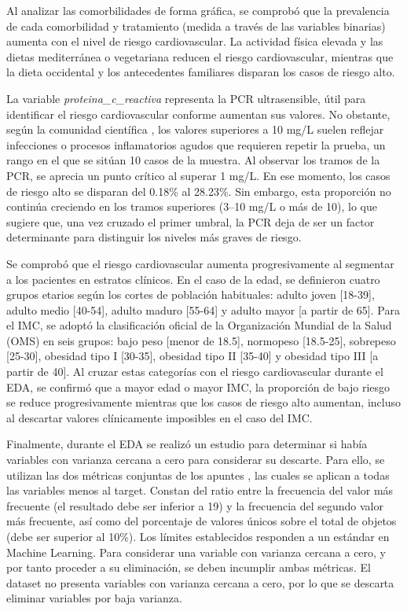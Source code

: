 \documentclass[journal,onecolumn]{IEEEtran}
\begin{document}
Al analizar las comorbilidades de forma gráfica, se comprobó que la prevalencia de cada comorbilidad y tratamiento (medida a través de las variables binarias) aumenta con el nivel de riesgo cardiovascular. La actividad física elevada y las dietas mediterránea o vegetariana reducen el riesgo cardiovascular, mientras que la dieta occidental y los antecedentes familiares disparan los casos de riesgo alto.

La variable \textit{proteina\_c\_reactiva} representa la PCR ultrasensible, útil para identificar el riesgo cardiovascular conforme aumentan sus valores. No obstante, según la comunidad científica \cite{pearson2003crp}, los valores superiores a 10 mg/L suelen reflejar infecciones o procesos inflamatorios agudos que requieren repetir la prueba, un rango en el que se sitúan 10 casos de la muestra. Al observar los tramos de la PCR, se aprecia un punto crítico al superar 1 mg/L. En ese momento, los casos de riesgo alto se disparan del 0.18\% al 28.23\%. Sin embargo, esta proporción no continúa creciendo en los tramos superiores (3–10 mg/L o más de 10), lo que sugiere que, una vez cruzado el primer umbral, la PCR deja de ser un factor determinante para distinguir los niveles más graves de riesgo.

Se comprobó que el riesgo cardiovascular aumenta progresivamente al segmentar a los pacientes en estratos clínicos. En el caso de la edad, se definieron cuatro grupos etarios según los cortes de población habituales: adulto joven [18-39], adulto medio [40-54], adulto maduro [55-64] y adulto mayor [a partir de 65]. Para el IMC, se adoptó la clasificación oficial de la Organización Mundial de la Salud (OMS) \cite{who2000obesity} en seis grupos: bajo peso [menor de 18.5], normopeso [18.5-25], sobrepeso [25-30], obesidad tipo I [30-35], obesidad tipo II [35-40] y obesidad tipo III [a partir de 40]. Al cruzar estas categorías con el riesgo cardiovascular durante el EDA, se confirmó que a mayor edad o mayor IMC, la proporción de bajo riesgo se reduce progresivamente mientras que los casos de riesgo alto aumentan, incluso al descartar valores clínicamente imposibles en el caso del IMC.

Finalmente, durante el EDA se realizó un estudio para determinar si había variables con varianza cercana a cero para considerar su descarte. Para ello, se utilizan las dos métricas conjuntas de los apuntes \cite{kuhn2013applied}, las cuales se aplican a todas las variables menos al target. Constan del ratio entre la frecuencia del valor más frecuente (el resultado debe ser inferior a 19) y la frecuencia del segundo valor más frecuente, así como del porcentaje de valores únicos sobre el total de objetos (debe ser superior al 10\%). Los límites establecidos responden a un estándar en Machine Learning. Para considerar una variable con varianza cercana a cero, y por tanto proceder a su eliminación, se deben incumplir ambas métricas. El dataset no presenta variables con varianza cercana a cero, por lo que se descarta eliminar variables por baja varianza.
\end{document}
